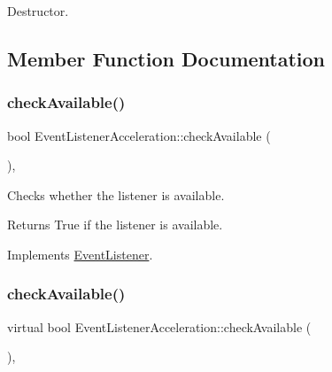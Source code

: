Destructor. 

\subsection{Member Function Documentation}
\mbox{\label{classEventListenerAcceleration_a3226671264e6e4dd44a29e36986eba11}} 
\subsubsection{\texorpdfstring{check\+Available()}{checkAvailable()}\hspace{0.1cm}{\footnotesize\ttfamily [1/2]}}
{\footnotesize\ttfamily bool Event\+Listener\+Acceleration\+::check\+Available (\begin{DoxyParamCaption}{ }\end{DoxyParamCaption})\hspace{0.3cm}{\ttfamily [override]}, {\ttfamily [virtual]}}

Checks whether the listener is available.

\begin{DoxyReturn}{Returns}
True if the listener is available. 
\end{DoxyReturn}


Implements \hyperlink{classEventListener_adf9e4eb37ea6e94c05f4d1b6594bd35e}{Event\+Listener}.

\mbox{\label{classEventListenerAcceleration_aa69415757d82f35612610dc767fd0aab}} 
\subsubsection{\texorpdfstring{check\+Available()}{checkAvailable()}\hspace{0.1cm}{\footnotesize\ttfamily [2/2]}}
{\footnotesize\ttfamily virtual bool Event\+Listener\+Acceleration\+::check\+Available (\begin{DoxyParamCaption}{ }\end{DoxyParamCaption})\hspace{0.3cm}{\ttfamily [override]}, {\ttfamily [virtual]}}

